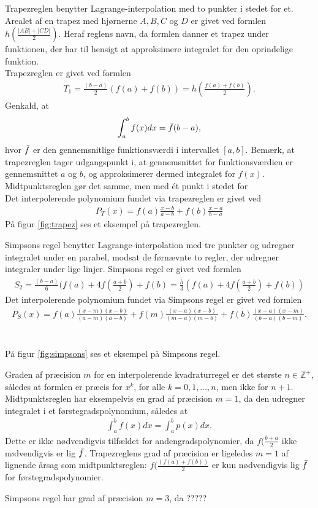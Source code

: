 Trapezreglen benytter Lagrange-interpolation med to punkter i stedet for et. 
Arealet af en trapez med hjørnerne $A, B, C$ og $D$ er givet ved formlen $h(\frac{|AB| + |CD|}{2})$. 
Heraf reglens navn, da formlen danner et trapez under funktionen, der har til hensigt at approksimere integralet for den oprindelige funktion. \\
Trapezreglen er givet ved formlen 
\begin{align*}
T_1 = \frac{(b-a)}{2}(f(a)+f(b))=h (\frac{f(a)+f(b)}{2}).
\end{align*}
Genkald, at 
\begin{align}
    \int_{a}^{b} f(x) dx = \Bar{f}(b-a),
\end{align}
hvor $\Bar{f}$ er den gennemsnitlige funktionsværdi i intervallet $[a,b]$.
Bemærk, at trapezreglen tager udgangspunkt i, at gennemsnittet for funktionsværdien er gennemsnittet $a$ og $b$, og approksimerer dermed integralet for $f(x)$. 
Midtpunktsreglen gør det samme, men med ét punkt i stedet for 
\\
Det interpolerende polynomium fundet via trapezreglen er givet ved
\begin{align*}
P_{T}(x)=f(a)\frac{x-b}{a-b}+f(b)\frac{x-a}{b-a}       
\end{align*}
På figur \ref{fig:trapez} ses et eksempel på trapezreglen. 


Simpsons regel benytter Lagrange-interpolation med tre punkter og udregner integralet under en parabel, modsat de førnævnte to regler, der udregner integraler under lige linjer. 
Simpsons regel er givet ved formlen 
\begin{align*}
S_2 = \frac{(b-a)}{6}(f(a)+4f(\frac{a+b}{2})+f(b)=\frac{\widetilde{h}}{3}(f(a)+4f(\frac{a+b}{2})+f(b))
\end{align*}
Det interpolerende polynomium fundet via Simpsons regel er givet ved formlen
\begin{align*}
P_{S}(x)=f(a)\frac{(x-m)(x-b)}{(a-m)(a-b)}+f(m)\frac{(x-a)(x-b)}{(m-a)(m-b)}+f(b)\frac{(x-a)(x-m)}{(b-a)(b-m)}.
\end{align*} \\\\
På figur \ref{fig:simpsons} ses et eksempel på Simpsons regel. 


Graden af præcision $m$ for en interpolerende kvadraturregel er det største $n \in \mathbb{Z^+}$, således at formlen er præcis for $x^k$, for alle $k = 0, 1, \ldots , n$, men ikke for $n+1$.
Midtpunktsreglen har eksempelvis en grad af præcision $m=1$, da den udregner integralet i et førstegradspolynomium, således at 
\begin{align}
    \int_{a}^{b} f(x) dx = \int_{a}^{b} p(x) dx.
\end{align}
Dette er ikke nødvendigvis tilfældet for andengradspolynomier, da $f(\frac{b+a}{2}$ ikke nødvendigvis er lig $\Bar{f}$. 
Trapezreglens grad af præcision er ligeledes $m=1$ af lignende årsag som midtpunktsreglen: $f(\frac{(f(a)+f(b))}{2}$ er kun nødvendigvis lig $\Bar{f}$ for førstegradspolynomier. 

Simpsons regel har grad af præcision $m=3$, da ?????
%